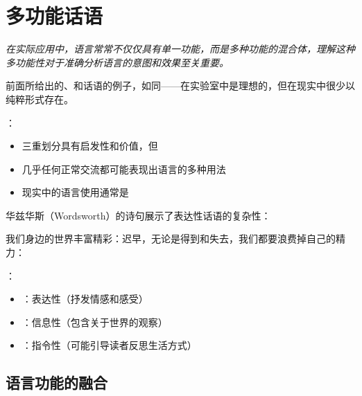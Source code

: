 \section{多功能话语}

\begin{logicbox}[title=引言]
\textit{在实际应用中，语言常常不仅仅具有单一功能，而是多种功能的混合体，理解这种多功能性对于准确分析语言的意图和效果至关重要。}
\end{logicbox}

\begin{theorembox}[title=理论与现实的差距]
前面所给出的、和话语的例子，如同——在实验室中是理想的，但在现实中很少以纯粹形式存在。

：
\begin{itemize}
  \item 三重划分具有启发性和价值，但
  \item 几乎任何正常交流都可能表现出语言的多种用法
  \item 现实中的语言使用通常是
\end{itemize}
\end{theorembox}

\begin{examplebox}[title=诗歌的多功能性]
华兹华斯（Wordsworth）的诗句展示了表达性话语的复杂性：

\begin{displayquote}
我们身边的世界丰富精彩：迟早，无论是得到和失去，我们都要浪费掉自己的精力：
\end{displayquote}

：
\begin{itemize}
  \item {}：表达性（抒发情感和感受）
  \item {}：信息性（包含关于世界的观察）
  \item {}：指令性（可能引导读者反思生活方式）
\end{itemize}
\end{examplebox}

\subsection{语言功能的融合}

